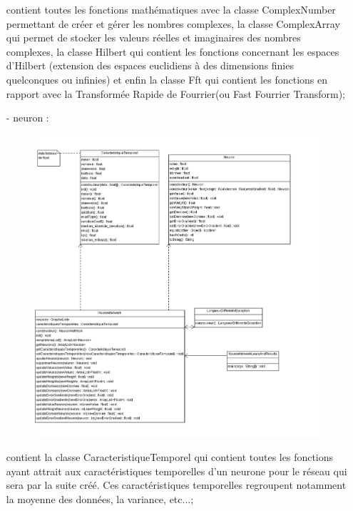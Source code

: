 \begin{itemize}
\begin{figure}[h!]
			\label{fig_math}
    		\end{figure} 
	contient toutes les fonctions mathématiques avec la classe ComplexNumber permettant de créer et gérer les nombres complexes, la classe ComplexArray qui permet de stocker les valeurs réelles et imaginaires des nombres complexes, la classe Hilbert qui contient les fonctions concernant les espaces d'Hilbert (extension des espaces euclidiens à des dimensions finies quelconques ou infinies) et enfin la classe Fft qui contient les fonctions en rapport avec la Transformée Rapide de Fourrier(ou Fast Fourrier Transform);
	\newpage
	\item [-] neuron : 
	\begin{figure}[h!]
			\centering
		    \includegraphics []{../diagramme_classes/neuron.png} \\
			\label{fig_neuron}
    		\end{figure}
	contient la classe CaracteristiqueTemporel qui contient toutes les fonctions ayant attrait aux caractéristiques temporelles d'un neurone pour le réseau qui sera par la suite créé. Ces caractéristiques temporelles regroupent notamment la moyenne des données, la variance, etc...;

\end{itemize}
